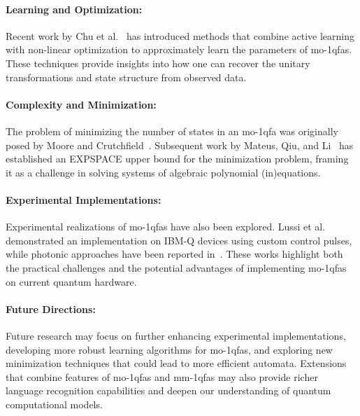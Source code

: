 \paragraph{Learning and Optimization:} Recent work by Chu et al.~\cite{chu2023approximately} has introduced methods that combine active learning with non-linear optimization to approximately learn the parameters of \glspl{mo-1qfa}. These techniques provide insights into how one can recover the unitary transformations and state structure from observed data.

\paragraph{Complexity and Minimization:} The problem of minimizing the number of states in an \gls{mo-1qfa} was originally posed by Moore and Crutchfield~\cite{moore2000quantum}. Subsequent work by Mateus, Qiu, and Li~\cite{mateus2012complexity} has established an EXPSPACE upper bound for the minimization problem, framing it as a challenge in solving systems of algebraic polynomial (in)equations.

\paragraph{Experimental Implementations:} Experimental realizations of \glspl{mo-1qfa} have also been explored. Lussi et al.~\cite{lussi2024implementing} demonstrated an implementation on IBM-Q devices using custom control pulses, while photonic approaches have been reported in~\cite{candeloro2021enhanced}. These works highlight both the practical challenges and the potential advantages of implementing \glspl{mo-1qfa} on current quantum hardware.

\paragraph{Future Directions:} Future research may focus on further enhancing experimental implementations, developing more robust learning algorithms for \glspl{mo-1qfa}, and exploring new minimization techniques that could lead to more efficient automata. Extensions that combine features of \glspl{mo-1qfa} and \gls{mm-1qfa}s may also provide richer language recognition capabilities and deepen our understanding of quantum computational models.

